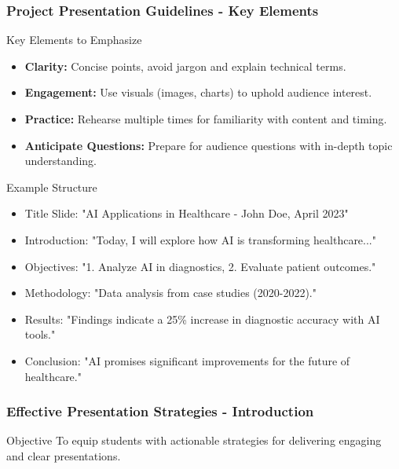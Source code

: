 \documentclass[aspectratio=169]{beamer}
\begin{document}
\begin{frame}[fragile]
    \frametitle{Project Presentation Guidelines - Key Elements}
    \begin{block}{Key Elements to Emphasize}
        \begin{itemize}
            \item \textbf{Clarity:} Concise points, avoid jargon and explain technical terms.
            \item \textbf{Engagement:} Use visuals (images, charts) to uphold audience interest.
            \item \textbf{Practice:} Rehearse multiple times for familiarity with content and timing.
            \item \textbf{Anticipate Questions:} Prepare for audience questions with in-depth topic understanding.
        \end{itemize}
    \end{block}
    \begin{block}{Example Structure}
        \begin{itemize}
            \item Title Slide: "AI Applications in Healthcare - John Doe, April 2023"
            \item Introduction: "Today, I will explore how AI is transforming healthcare..."
            \item Objectives: "1. Analyze AI in diagnostics, 2. Evaluate patient outcomes."
            \item Methodology: "Data analysis from case studies (2020-2022)."
            \item Results: "Findings indicate a 25\% increase in diagnostic accuracy with AI tools."
            \item Conclusion: "AI promises significant improvements for the future of healthcare."
        \end{itemize}
    \end{block}
\end{frame}

\begin{frame}[fragile]
    \frametitle{Effective Presentation Strategies - Introduction}
    \begin{block}{Objective}
        To equip students with actionable strategies for delivering engaging and clear presentations.
    \end{block}
\end{frame}
\end{document}
